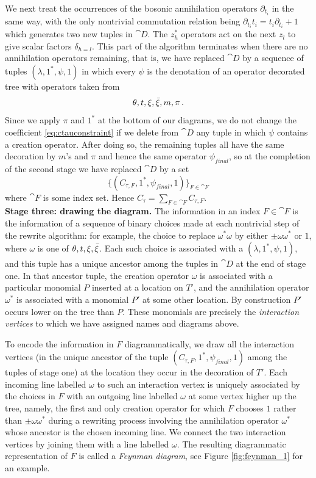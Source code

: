 \documentclass[english,letter paper,12pt,leqno]{article}
\theoremstyle{example}
\numberwithin{equation}{section}
\begin{document}
We next treat the occurrences of the bosonic annihilation operators $\partial_{t_i}$ in the same way, with the only nontrivial commutation relation being $\partial_{t_i} t_i = t_i \partial_{t_i} + 1$ which generates two new tuples in $\cat{D}$. The $z_h^*$ operators act on the next $z_l$ to give scalar factors $\delta_{h=l}$. This part of the algorithm terminates when there are no annihilation operators remaining, that is, we have replaced $\cat{D}$ by a sequence of tuples $(\lambda, 1^*, \psi, 1)$ in which every $\psi$ is the denotation of an operator decorated tree with operators taken from
\[
\theta, t, \xi, \Bar{\xi}, m, \pi\,.
\]
Since we apply $\pi$ and $1^*$ at the bottom of our diagrams, we do not change the coefficient \eqref{eq:ctauconstraint} if we delete from $\cat{D}$ any tuple in which $\psi$ contains a creation operator. After doing so, the remaining tuples all have the same decoration by $m$'s and $\pi$ and hence the same operator $\psi_{final}$, so at the completion of the second stage we have replaced $\cat{D}$ by a set
\[
\Big\{ (C_{\tau, F}, 1^*, \psi_{final}, 1) \Big\}_{F \in \cat{F}}
\]
where $\cat{F}$ is some index set. Hence $C_\tau = \sum_{F \in \cat{F}} C_{\tau, F}$.
\\

\textbf{Stage three: drawing the diagram.} The information in an index $F \in \cat{F}$ is the information of a sequence of binary choices made at each nontrivial step of the rewrite algorithm: for example, the choice to replace $\omega^* \omega$ by either $\pm \omega \omega^*$ or $1$, where $\omega$ is one of $\theta, t, \xi, \Bar{\xi}$. Each such choice is associated with a $(\lambda, 1^*, \psi, 1)$, and this tuple has a unique ancestor among the tuples in $\cat{D}$ at the end of stage one. In that ancestor tuple, the creation operator $\omega$ is associated with a particular monomial $P$ inserted at a location on $T'$, and the annihilation operator $\omega^*$ is associated with a monomial $P'$ at some other location. By construction $P'$ occurs lower on the tree than $P$. These monomials are precisely the \emph{interaction vertices} to which we have assigned names and diagrams above.

To encode the information in $F$ diagrammatically, we draw all the interaction vertices (in the unique ancestor of the tuple $(C_{\tau, F}, 1^*, \psi_{final}, 1)$ among the tuples of stage one) at the location they occur in the decoration of $T'$. Each incoming line labelled $\omega$ to such an interaction vertex is uniquely associated by the choices in $F$ with an outgoing line labelled $\omega$ at some vertex higher up the tree, namely, the first and only creation operator for which $F$ chooses $1$ rather than $\pm \omega \omega^*$ during a rewriting process involving the annihilation operator $\omega^*$ whose ancestor is the chosen incoming line. We connect the two interaction vertices by joining them with a line labelled $\omega$. The resulting diagrammatic representation of $F$ is called a \emph{Feynman diagram}, see Figure \ref{fig:feynman_1} for an example.
\\
\end{document}

